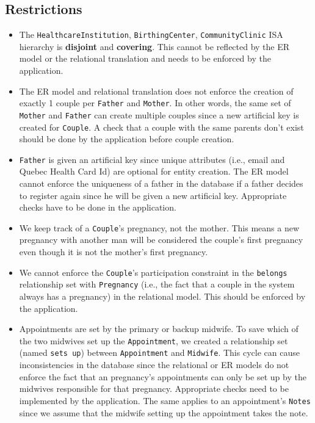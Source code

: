 \documentclass[10pt, letterpaper]{article}
\newcommand{\code}[1]{\texttt{#1}}
\begin{document}
\subsection*{Restrictions}
\begin{itemize}
    \item The \code{HealthcareInstitution}, \code{BirthingCenter}, \code{CommunityClinic} ISA hierarchy is \textbf{disjoint} and \textbf{covering}. This cannot be reflected by the ER model or the relational translation and needs to be enforced by the application.
    \item The ER model and relational translation does not enforce the creation of exactly 1 couple per \code{Father} and \code{Mother}. In other words, the same set of \code{Mother} and \code{Father} can create multiple couples since a new artificial key is created for \code{Couple}. A check that a couple with the same parents don't exist should be done by the application before couple creation.
    \item \code{Father} is given an artificial key since unique attributes (i.e., email and Quebec Health Card Id) are optional for entity creation. The ER model cannot enforce the uniqueness of a father in the database if a father decides to register again since he will be given a new artificial key. Appropriate checks have to be done in the application.
    \item We keep track of a \code{Couple}'s pregnancy, not the mother. This means a new pregnancy with another man will be considered the couple's first pregnancy even though it is not the mother's first pregnancy.
    \item We cannot enforce the \code{Couple}'s participation constraint in the \code{belongs} relationship set with \code{Pregnancy} (i.e., the fact that a couple in the system always has a pregnancy) in the relational model. This should be enforced by the application.
    \item Appointments are set by the primary or backup midwife. To save which of the two midwives set up the \code{Appointment}, we created a relationship set (named \code{sets up}) between \code{Appointment} and \code{Midwife}. This cycle can cause inconsistencies in the database since the relational or ER models do not enforce the fact that an pregnancy's appointments can only be set up by the midwives responsible for that pregnancy. Appropriate checks need to be implemented by the application. The same applies to an appointment's \code{Notes} since we assume that the midwife setting up the appointment takes the note.

\end{itemize}
\end{document}
